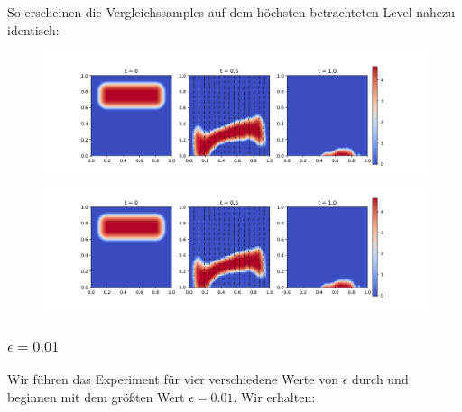 So erscheinen die Vergleichssamples auf dem höchsten betrachteten Level nahezu identisch:
\begin{figure}[H]
	\centering
	\includegraphics[width=\textwidth]{plots/sample_7_0.png} 
	\includegraphics[width=\textwidth]{plots/sample_coarse_7_0.png} 
\end{figure}
\subsubsection{$ \epsilon=0.01 $}
Wir führen das Experiment für vier verschiedene Werte von $ \epsilon $ durch und beginnen mit dem größten Wert $ \epsilon=0.01 $. Wir erhalten: 


